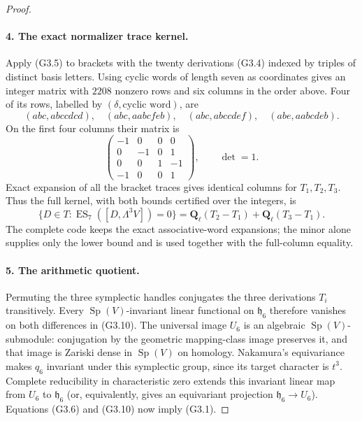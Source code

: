 \begin{proof}
\paragraph{4. The exact normalizer trace kernel.}
Apply (G3.5) to brackets with the twenty derivations
(G3.4) indexed by triples of distinct basis letters.
Using cyclic words of length seven as coordinates
gives an integer matrix with $2208$ nonzero rows and
six columns in the order above. Four of its rows,
labelled by $(\delta,\text{cyclic word})$, are
\[
 (abc,abccdcd),\quad(abc,aabcfeb),\quad
 (abc,abccdef),\quad(abe,aabcdeb).
\]
On the first four columns their matrix is
\[
 \begin{pmatrix}
 -1&0&0&0\\
 0&-1&0&1\\
 0&0&1&-1\\
 -1&0&0&1
 \end{pmatrix},\qquad\det=1.                              \tag{G3.9}
\]
Exact expansion of all the bracket traces gives identical
columns for $T_1,T_2,T_3$. Thus the full kernel, with
both bounds certified over the integers, is
\[
 \{D\in T:\operatorname{ES}_7([D,\Lambda^3V])=0\}
       =\mathbf Q_\ell(T_2-T_1)+\mathbf Q_\ell(T_3-T_1).
                                                               \tag{G3.10}
\]
The complete code keeps the exact associative-word
expansions; the minor alone supplies only the lower
bound and is used together with the full-column equality.

\paragraph{5. The arithmetic quotient.}
Permuting the three symplectic handles conjugates the
three derivations $T_i$ transitively. Every
$\operatorname{Sp}(V)$-invariant linear functional on
$\mathfrak h_6$ therefore vanishes on both differences
in (G3.10). The universal image $U_6$ is an algebraic
$\operatorname{Sp}(V)$-submodule: conjugation by the
geometric mapping-class image preserves it, and that
image is Zariski dense in $\operatorname{Sp}(V)$ on
homology. Nakamura's equivariance makes $q_6$ invariant
under this symplectic group, since its target character
is $t^3$. Complete reducibility in characteristic zero
extends this invariant linear map from $U_6$ to
$\mathfrak h_6$ (or, equivalently, gives an equivariant
projection $\mathfrak h_6\to U_6$). Equations (G3.6)
and (G3.10) now imply (G3.1).


\end{proof}
